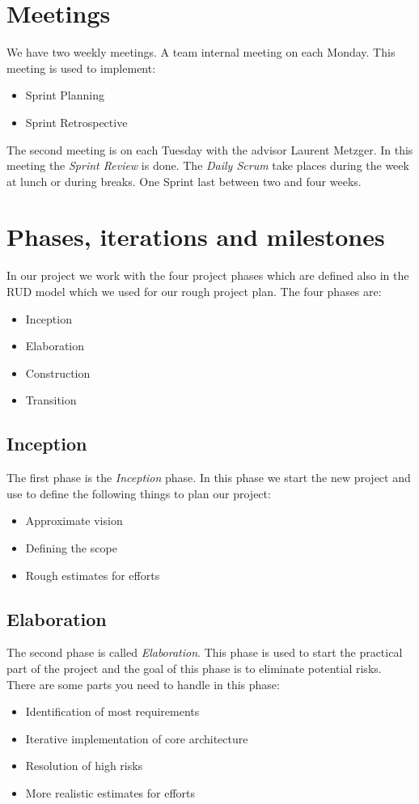 \section{Meetings}
\label{meetings}
We have two weekly meetings.
A team internal meeting on each Monday.
This meeting is used to implement:
\begin{itemize}
  \item Sprint Planning
  \item Sprint Retrospective 
\end{itemize}

\noindent The second meeting is on each Tuesday with the advisor Laurent Metzger.
In this meeting the \textsl{Sprint Review} is done.
The \textsl{Daily Scrum} take places during the week at lunch or during breaks.
One Sprint last between two and four weeks.


\section{Phases, iterations and milestones}
\label{phases}
In our project we work with the four project phases which are defined also in the RUD model which we used for our rough project plan. The four phases are:
\begin{itemize}
    \item Inception
    \item Elaboration
    \item Construction
    \item Transition
\end{itemize}

\subsection{Inception}
The first phase is the \textit{Inception} phase. In this phase we start the new project and use to define the following things to plan our project:
\begin{itemize}
    \item Approximate vision
    \item Defining the scope
    \item Rough estimates for efforts
\end{itemize}

\subsection{Elaboration}
The second phase is called \textit{Elaboration}. This phase is used to start the practical part of the project and the goal of this phase is to eliminate potential risks. There are some parts you need to handle in this phase:
\begin{itemize}
    \item Identification of most requirements
    \item Iterative implementation of core architecture
    \item Resolution of high risks
    \item More realistic estimates for efforts
\end{itemize}

